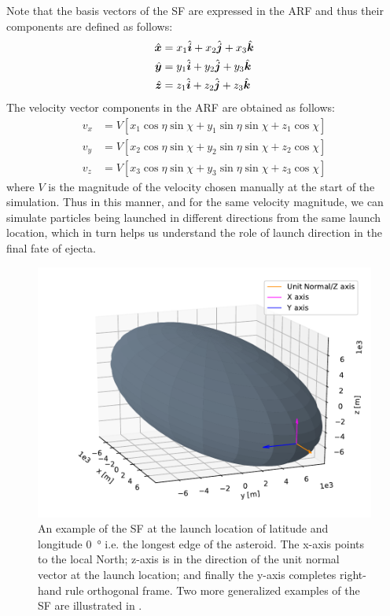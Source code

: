 %
\newline\newline
%
Note that the basis vectors of the \gls{SF} are expressed in the \gls{ARF} and thus their components are defined as follows:
\begin{align}
    \hat{\bm{x}} &= x_1\hat{\bm{i}} + x_2\hat{\bm{j}} + x_3\hat{\bm{k}}
    \label{eqn:sf_xbasis_exp} \\
    \hat{\bm{y}} &= y_1\hat{\bm{i}} + y_2\hat{\bm{j}} + y_3\hat{\bm{k}}
    \label{eqn:sf_ybasis_exp} \\
    \hat{\bm{z}} &= z_1\hat{\bm{i}} + z_2\hat{\bm{j}} + z_3\hat{\bm{k}}
    \label{eqn:sf_zbasis_exp}
\end{align}
The velocity vector components in the \gls{ARF} are obtained as follows:
\begin{align}
    v_x &= V \left[ x_1 \cos\eta \sin\chi + y_1 \sin\eta \sin\chi + z_1 \cos\chi \right]
    \label{eqn:xVelocity} \\
    v_y &= V \left[ x_2 \cos\eta \sin\chi + y_2 \sin\eta \sin\chi + z_2 \cos\chi \right]
    \label{eqn:yVelocity} \\
    v_z &= V \left[ x_3 \cos\eta \sin\chi + y_3 \sin\eta \sin\chi + z_3 \cos\chi \right]
    \label{eqn:zVelocity}
\end{align}
where $V$ is the magnitude of the velocity chosen manually at the start of the simulation. Thus in this manner, and for the same velocity magnitude, we can simulate particles being launched in different directions from the same launch location, which in turn helps us understand the role of launch direction in the final fate of ejecta.
\begin{figure}[htb]
\centering
\captionsetup{justification=centering}
\includegraphics[width=\textwidth, height=0.25\textheight, keepaspectratio=true]{surfaceFrame_longestEdge.pdf}
\caption{An example of the \gls{SF} at the launch location of latitude and longitude \SI{0}{\degree} i.e. the longest edge of the asteroid. The x-axis points to the local North; z-axis is in the direction of the unit normal vector at the launch location; and finally the y-axis completes right-hand rule orthogonal frame. Two more generalized examples of the \gls{SF} are illustrated in .}
\label{fig:surface_frame}
\end{figure}
